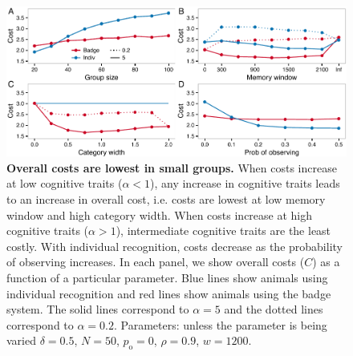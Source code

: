 \begin{figure}
\includegraphics[width=6.85in]{figures/costs.pdf}
\caption{\sffamily\small\textbf{Overall costs are lowest in small groups.} When costs increase at low cognitive traits ($\alpha<1$), any increase in cognitive traits leads to an increase in overall cost, i.e. costs are lowest at low memory window and high category width. When costs increase at high cognitive traits ($\alpha>1$), intermediate cognitive traits are the least costly.  With individual recognition, costs decrease as the probability of observing increases. In each panel, we show overall costs ($C$) as a function of a particular parameter. Blue lines show animals using individual recognition and red lines show animals using the badge system. The solid lines correspond to $\alpha=5$ and the dotted lines correspond to $\alpha=0.2$.  Parameters: unless the parameter is being varied $\delta = 0.5$, $N=50$, $p_\text{o}=0$, $\rho=0.9$, $w=1200$.}
\label{costs}
\end{figure}

